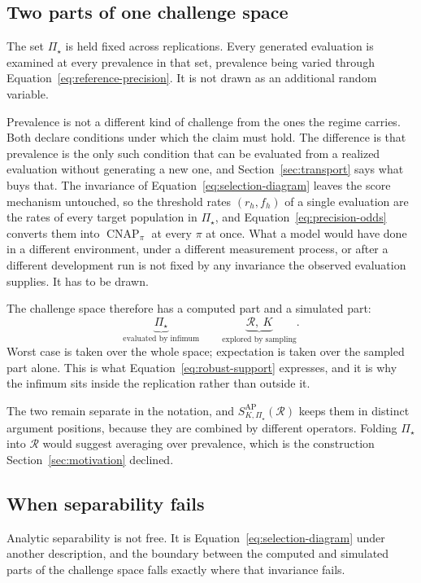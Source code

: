 \documentclass[11pt]{article}
\newcommand{\CNAP}{\operatorname{CNAP}}
\newcommand{\Regime}{\mathcal{R}}
\newcommand{\PSet}{\Pi_\star}
\theoremstyle{remark}
\begin{document}
\subsection{Two parts of one challenge space}
\label{sec:challenge-space}

The set $\PSet$ is held fixed across replications. Every generated evaluation is examined at every prevalence in that set, prevalence being varied through Equation~\eqref{eq:reference-precision}. It is not drawn as an additional random variable.

Prevalence is not a different kind of challenge from the ones the regime carries. Both declare conditions under which the claim must hold. The difference is that prevalence is the only such condition that can be evaluated from a realized evaluation without generating a new one, and Section~\ref{sec:transport} says what buys that. The invariance of Equation~\eqref{eq:selection-diagram} leaves the score mechanism untouched, so the threshold rates $(r_h,f_h)$ of a single evaluation are the rates of every target population in $\PSet$, and Equation~\eqref{eq:precision-odds} converts them into $\CNAP_\pi$ at every $\pi$ at once. What a model would have done in a different environment, under a different measurement process, or after a different development run is not fixed by any invariance the observed evaluation supplies. It has to be drawn.

The challenge space therefore has a computed part and a simulated part:
\[
\underbrace{\PSet}_{\text{evaluated by infimum}}
\qquad
\underbrace{\Regime,\ K}_{\text{explored by sampling}}.
\]
Worst case is taken over the whole space; expectation is taken over the sampled part alone. This is what Equation~\eqref{eq:robust-support} expresses, and it is why the infimum sits inside the replication rather than outside it.

The two remain separate in the notation, and $S_{K,\PSet}^{\mathrm{AP}}(\Regime)$ keeps them in distinct argument positions, because they are combined by different operators. Folding $\PSet$ into $\Regime$ would suggest averaging over prevalence, which is the construction Section~\ref{sec:motivation} declined.

\subsection{When separability fails}
\label{sec:separability}

Analytic separability is not free. It is Equation~\eqref{eq:selection-diagram} under another description, and the boundary between the computed and simulated parts of the challenge space falls exactly where that invariance fails.
\end{document}
